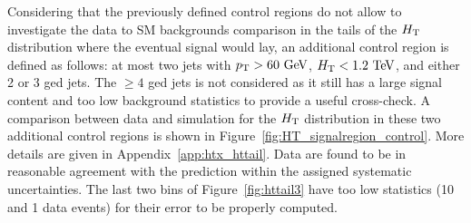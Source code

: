 

Considering that the previously defined control regions do not allow
to investigate the data to SM backgrounds comparison in
the tails of the $\HT$ distribution where the eventual signal would lay,
an additional control region is defined as follows: 
at most two jets with $\pt>60\gev$, $\HT<1.2\tev$, and either 2 or 3 \btag ged jets.
The  $\geq 4$ \btag ged jets is not considered as it still has 
a large signal content and too low background statistics to provide
a useful cross-check.
A comparison between data and simulation for the $\HT$ distribution 
in these two additional control regions is shown in 
Figure~\ref{fig:HT_signalregion_control}. More details are given 
in Appendix~\ref{app:htx_httail}.
Data are found to be in reasonable agreement with the 
prediction within the assigned systematic uncertainties. 
The last two bins of Figure~\ref{fig:httail3} have too low
statistics (10 and 1 data events) for their error to be properly computed.

